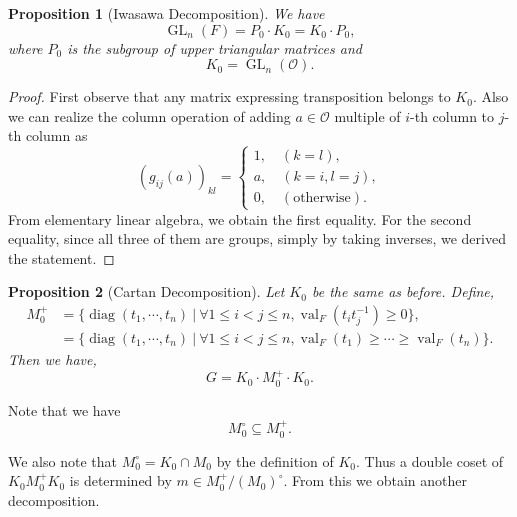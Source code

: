 \documentclass[8pt]{article}
\newtheorem{proposition}{Proposition}[section]
\DeclareMathOperator{\GL}{GL}
\DeclareMathOperator{\val}{val}
\DeclareMathOperator{\diag}{diag}
\newcommand{\sep}[0]{\:|\:}
\begin{document}
\begin{proposition}[Iwasawa Decomposition]
  We have 
  \begin{equation*}
    \GL_n(F) = P_0\cdot K_0 = K_0\cdot P_0,
  \end{equation*}
  where $P_0$ is the subgroup of upper triangular matrices and 
  \begin{equation*}
    K_0 = \GL_n(\mathcal{O}).
  \end{equation*}
\end{proposition}

\begin{proof}
  First observe that any matrix expressing transposition belongs to $K_0$. Also we can realize the column operation of adding $a\in\mathcal{O}$ multiple of $i$-th column to $j$-th column as 
  \begin{equation*}
    (g_{ij}(a))_{kl} = \begin{cases}
      1,\quad (k=l),\\
      a, \quad (k=i,l=j),\\
      0, \quad(\text{otherwise}).
    \end{cases}
  \end{equation*}
  From elementary linear algebra, we obtain the first equality. For the second equality, since all three of them are groups, simply by taking inverses, we derived the statement.
\end{proof}

\begin{proposition}[Cartan Decomposition]
  Let $K_0$ be the same as before. Define,
  \begin{align*}
    M_0^+ & = \{\diag(t_1,\cdots,t_n)\sep \forall 1\leq i<j\leq n, \val_F(t_it_j^{-1})\geq 0\},\\
    & = \{\diag(t_1,\cdots,t_n)\sep \forall 1\leq i<j\leq n, \val_F(t_1)\geq\cdots\geq\val_F(t_n)\}.
  \end{align*}
  Then we have,
  \begin{equation*}
    G = K_0\cdot M_0^+ \cdot K_0.
  \end{equation*}
\end{proposition}

Note that we have 
\begin{equation*}
  M_0^\circ\subseteq M_0^+.
\end{equation*}

We also note that $M_0^\circ = K_0\cap M_0$ by the definition of $K_0$. Thus a double coset of $K_0 M_0^+K_0$ is determined by $m\in M_0^+/(M_0)^\circ$.
From this we obtain another decomposition.
\end{document}
